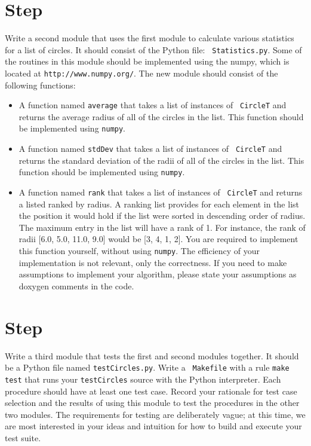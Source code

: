 \documentclass[12pt]{article}
\newcounter{stepnum}
\begin{document}
\section *{Step  \thestepnum}

Write a second module that uses the first module to calculate various statistics
for a list of circles.  It should consist of the Python file: {\tt
  Statistics.py}.  Some of the routines in this module should be implemented
using the numpy, which is located at {\tt http://www.numpy.org/}.  The new
module should consist of the following functions:

\begin{itemize}

\item A function named {\tt average} that takes a list of instances of {\tt
    CircleT} and returns the average radius of all of the circles in the list.
  This function should be implemented using {\tt numpy}.

\item A function named {\tt stdDev} that takes a list of instances of {\tt
    CircleT} and returns the standard deviation of the radii of all of the
  circles in the list.  This function should be implemented using {\tt numpy}.

\item A function named {\tt rank} that takes a list of instances of {\tt
    CircleT} and returns a listed ranked by radius.  A ranking list provides for each
  element in the list the position it would hold if the list were sorted in
  descending order of radius.  The maximum entry in the list will have a rank of 1.  For
  instance, the rank of radii [6.0, 5.0, 11.0, 9.0] would be [3, 4, 1, 2].  You are
  required to implement this function yourself, without using {\tt numpy}.  The
  efficiency of your implementation is not relevant, only the correctness.  If
  you need to make assumptions to implement your algorithm, please state your
  assumptions as doxygen comments in the code.

\end{itemize}

\section *{Step  \thestepnum}

Write a third module that tests the first and second modules together.  It
should be a Python file named {\tt testCircles.py}.  Write a {\tt
  Makefile} with a rule {\tt make test} that runs your {\tt testCircles} source
with the Python interpreter.  Each procedure should have at least
one test case.  Record your rationale for test case selection and the results of
using this module to test the procedures in the other two modules.  The
requirements for testing are deliberately vague; at this time, we are most
interested in your ideas and intuition for how to build and execute your test
suite.
\end{document}
